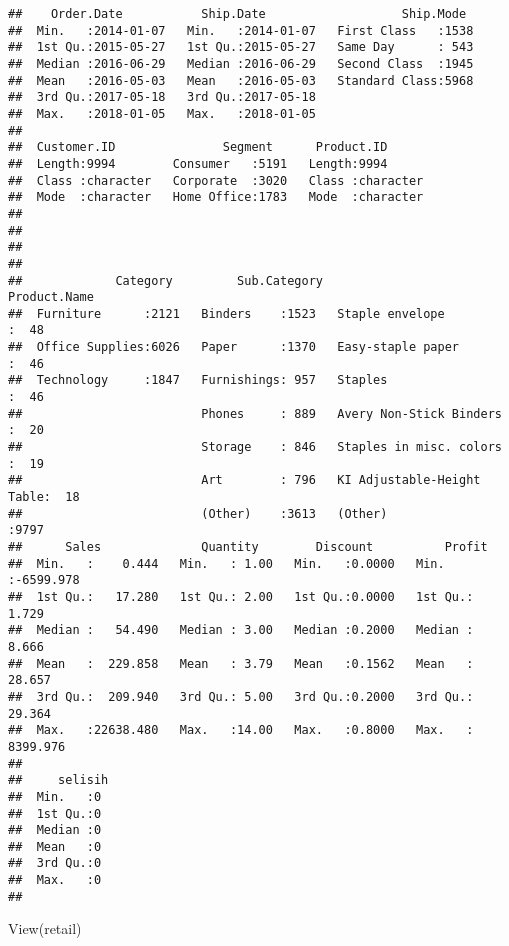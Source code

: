 \documentclass[
]{article}
\newenvironment{Shaded}{\begin{snugshade}}{\end{snugshade}}
\newcommand{\FunctionTok}[1]{\textcolor[rgb]{0.00,0.00,0.00}{#1}}
\newcommand{\NormalTok}[1]{#1}
\begin{document}
\begin{verbatim}
##    Order.Date           Ship.Date                   Ship.Mode   
##  Min.   :2014-01-07   Min.   :2014-01-07   First Class   :1538  
##  1st Qu.:2015-05-27   1st Qu.:2015-05-27   Same Day      : 543  
##  Median :2016-06-29   Median :2016-06-29   Second Class  :1945  
##  Mean   :2016-05-03   Mean   :2016-05-03   Standard Class:5968  
##  3rd Qu.:2017-05-18   3rd Qu.:2017-05-18                        
##  Max.   :2018-01-05   Max.   :2018-01-05                        
##                                                                 
##  Customer.ID               Segment      Product.ID       
##  Length:9994        Consumer   :5191   Length:9994       
##  Class :character   Corporate  :3020   Class :character  
##  Mode  :character   Home Office:1783   Mode  :character  
##                                                          
##                                                          
##                                                          
##                                                          
##             Category         Sub.Category                      Product.Name 
##  Furniture      :2121   Binders    :1523   Staple envelope           :  48  
##  Office Supplies:6026   Paper      :1370   Easy-staple paper         :  46  
##  Technology     :1847   Furnishings: 957   Staples                   :  46  
##                         Phones     : 889   Avery Non-Stick Binders   :  20  
##                         Storage    : 846   Staples in misc. colors   :  19  
##                         Art        : 796   KI Adjustable-Height Table:  18  
##                         (Other)    :3613   (Other)                   :9797  
##      Sales              Quantity        Discount          Profit         
##  Min.   :    0.444   Min.   : 1.00   Min.   :0.0000   Min.   :-6599.978  
##  1st Qu.:   17.280   1st Qu.: 2.00   1st Qu.:0.0000   1st Qu.:    1.729  
##  Median :   54.490   Median : 3.00   Median :0.2000   Median :    8.666  
##  Mean   :  229.858   Mean   : 3.79   Mean   :0.1562   Mean   :   28.657  
##  3rd Qu.:  209.940   3rd Qu.: 5.00   3rd Qu.:0.2000   3rd Qu.:   29.364  
##  Max.   :22638.480   Max.   :14.00   Max.   :0.8000   Max.   : 8399.976  
##                                                                          
##     selisih 
##  Min.   :0  
##  1st Qu.:0  
##  Median :0  
##  Mean   :0  
##  3rd Qu.:0  
##  Max.   :0  
## 
\end{verbatim}

\begin{Shaded}
\begin{Highlighting}[]
\FunctionTok{View}\NormalTok{(retail)}
\end{Highlighting}
\end{Shaded}
\end{document}
